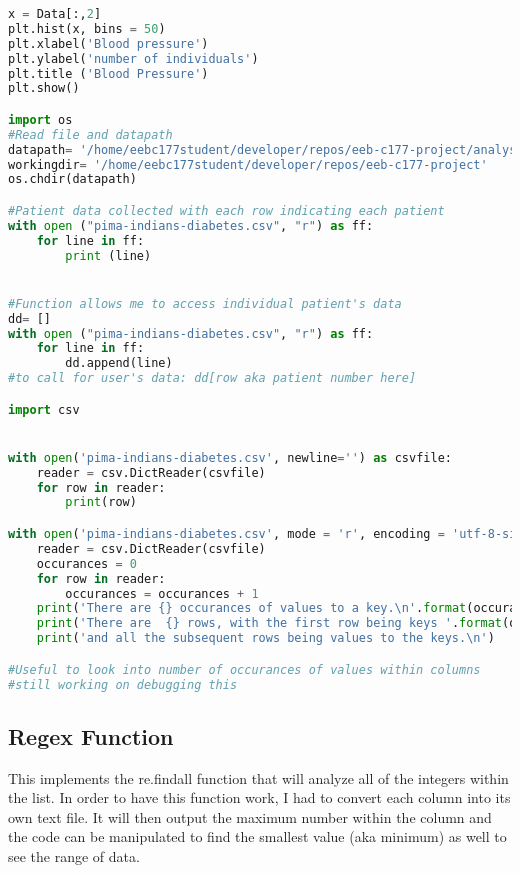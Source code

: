 \documentclass [letterpaper]{article}
\begin{document}
\begin{lstlisting}[language=Python]
x = Data[:,2]
plt.hist(x, bins = 50)
plt.xlabel('Blood pressure')
plt.ylabel('number of individuals')
plt.title ('Blood Pressure')
plt.show()

import os
#Read file and datapath
datapath= '/home/eebc177student/developer/repos/eeb-c177-project/analyses'
workingdir= '/home/eebc177student/developer/repos/eeb-c177-project'
os.chdir(datapath)

#Patient data collected with each row indicating each patient
with open ("pima-indians-diabetes.csv", "r") as ff: 
    for line in ff:
        print (line)


#Function allows me to access individual patient's data
dd= []
with open ("pima-indians-diabetes.csv", "r") as ff: 
    for line in ff:
        dd.append(line)
#to call for user's data: dd[row aka patient number here]

import csv


with open('pima-indians-diabetes.csv', newline='') as csvfile:
    reader = csv.DictReader(csvfile)
    for row in reader:
        print(row)

with open('pima-indians-diabetes.csv', mode = 'r', encoding = 'utf-8-sig') as csvfile:
    reader = csv.DictReader(csvfile)
    occurances = 0
    for row in reader:
        occurances = occurances + 1
    print('There are {} occurances of values to a key.\n'.format(occurances))
    print('There are  {} rows, with the first row being keys '.format(occurances+1))
    print('and all the subsequent rows being values to the keys.\n')

#Useful to look into number of occurances of values within columns
#still working on debugging this

\end{lstlisting}

\subsection{Regex Function}

This implements the re.findall function that will analyze all of the integers within the list. In order to have this function work, I had to convert each column into its own text file. It will then output the maximum number within the column and the code can be manipulated to find the smallest value (aka minimum) as well to see the range of data.
\end{document}
